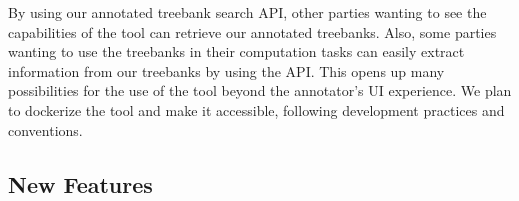 By using our annotated treebank search API, other parties wanting to see the capabilities of the tool can retrieve our annotated treebanks.
Also, some parties wanting to use the treebanks in their computation tasks can easily extract information from our treebanks by using the API.
This opens up many possibilities for the use of the tool beyond the annotator's UI experience.
We plan to dockerize the tool and make it accessible, following development practices and conventions.

\subsection{New Features}
\label{sec:features}


